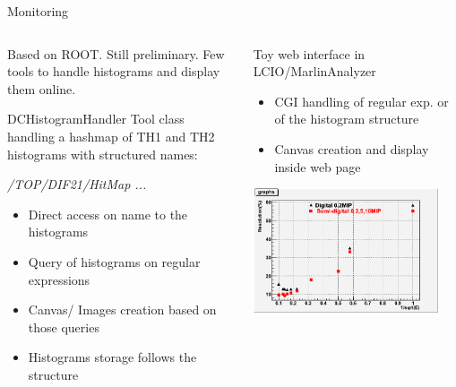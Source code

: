 \documentclass[10pt]{beamer}
\begin{document}
\begin{frame}[shrink=5]{Monitoring}

\begin{columns}
\begin{column}{0.5\textwidth}
\par
Based on ROOT. Still preliminary. Few tools to handle histograms and display them online.


\begin{block}{DCHistogramHandler}
Tool class handling a hashmap of TH1 and TH2 histograms with structured names:
\par
{\sl /TOP/DIF21/HitMap ... }
\begin{itemize}
\item Direct access on name to the histograms
\item Query of histograms on regular expressions
\item Canvas/ Images creation based on those queries
\item Histograms storage follows the structure
\end{itemize}


\end{block}
\end{column}
 \begin{column}{0.5\textwidth}
\pause \begin{block}{Toy web interface in LCIO/MarlinAnalyzer}
\begin{itemize}
  \item CGI handling of regular exp. or of the histogram structure
  \item Canvas creation and display inside web page
\end{itemize}
\end{block}

   \centerline{\includegraphics[width=0.9\textwidth]{images/DigitalSemiDigital}}

\end{column}
\end{columns}
\end{frame}
\end{document}
